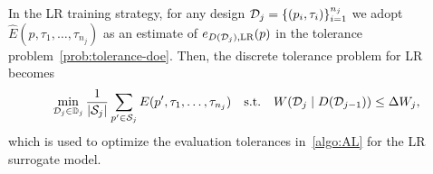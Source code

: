 In the LR training strategy, for any design $\mathcal D_j = \{ (p_i, \tau_i) \}_{i=1}^{n_j}$ we adopt $\hat{E} (p, \tau_1, \dots, \tau_{n_j})$ as an estimate of $e_{D(\mathcal D_j), \text{LR}}(p)$ in the tolerance problem~\eqref{prob:tolerance-doe}.
Then, the discrete tolerance problem for LR becomes
\begin{equation}\label{prob:discrete-tol-LR}       
    \min_{\mathcal D_{j} \in \mathbb D_j} \frac{1}{|\mathcal S_j|} \sum_{p' \in \mathcal S_j} E(p', \tau_1, \dots, \tau_{n_j})  \quad \text{s.t.} 
    \quad W(\mathcal D_{j} \mid D(\mathcal D_{j-1}) ) \le \Delta W_j, 
\end{equation} 
which is used to optimize the evaluation tolerances in~\ref{algo:AL} for the LR surrogate model. \newline